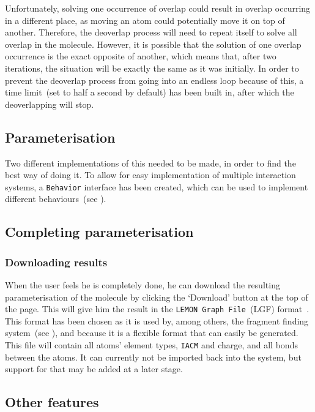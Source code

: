 Unfortunately, solving one occurrence of overlap could result in overlap occurring in a different place, as moving an atom could potentially move it on top of another. Therefore, the deoverlap process will need to repeat itself to solve all overlap in the molecule. However, it is possible that the solution of one overlap occurrence is the exact opposite of another, which means that, after two iterations, the situation will be exactly the same as it was initially. In order to prevent the deoverlap process from going into an endless loop because of this, a time limit~(set to half a second by default) has been built in, after which the deoverlapping will stop.

%

\subsection{Parameterisation}
Two different implementations of this needed to be made, in order to find the best way of doing it. To allow for easy implementation of multiple interaction systems, a \verb|Behavior| interface has been created, which can be used to implement different behaviours~(see ).

%

\subsection{Completing parameterisation}

\subsubsection{Downloading results}
When the user feels he is completely done, he can download the resulting parameterisation of the molecule by clicking the `Download' button at the top of the page. This will give him the result in the \verb|LEMON Graph File|~(LGF) format~\cite{dezso2011lemon}. This format has been chosen as it is used by, among others, the fragment finding system~(see ), and because it is a flexible format that can easily be generated. This file will contain all atoms' element types, \verb|IACM| and charge, and all bonds between the atoms. It can currently not be imported back into the system, but support for that may be added at a later stage.

%

\subsection{Other features}
